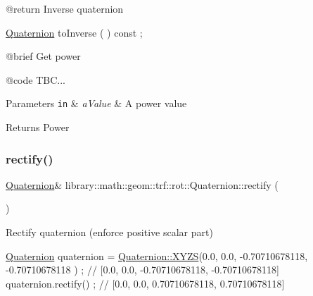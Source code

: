 \begin{DoxyCode}
    @\textcolor{keywordflow}{return}             Inverse quaternion

\hyperlink{classlibrary_1_1math_1_1geom_1_1trf_1_1rot_1_1_quaternion_aa7f459a08f5af38b9f7676a6bf36a21c}{Quaternion}              toInverse                                   ( ) \textcolor{keyword}{const} ;

    @brief              Get power
   
    @code
                        TBC...
\end{DoxyCode}



\begin{DoxyParams}[1]{Parameters}
\mbox{\tt in}  & {\em a\+Value} & A power value \\
\hline
\end{DoxyParams}
\begin{DoxyReturn}{Returns}
Power 
\end{DoxyReturn}
\mbox{\label{classlibrary_1_1math_1_1geom_1_1trf_1_1rot_1_1_quaternion_a1196e96c359237ae17b70c08f075acd2}} 
\subsubsection{\texorpdfstring{rectify()}{rectify()}}
{\footnotesize\ttfamily \hyperlink{classlibrary_1_1math_1_1geom_1_1trf_1_1rot_1_1_quaternion}{Quaternion}\& library\+::math\+::geom\+::trf\+::rot\+::\+Quaternion\+::rectify (\begin{DoxyParamCaption}{ }\end{DoxyParamCaption})}



Rectify quaternion (enforce positive scalar part) 


\begin{DoxyCode}
\hyperlink{classlibrary_1_1math_1_1geom_1_1trf_1_1rot_1_1_quaternion_aa7f459a08f5af38b9f7676a6bf36a21c}{Quaternion} quaternion = \hyperlink{classlibrary_1_1math_1_1geom_1_1trf_1_1rot_1_1_quaternion_ad6426210c54c79fc5296b5375380a7ca}{Quaternion::XYZS}(0.0, 0.0, -0.70710678118, -0.70710678118
      ) ; \textcolor{comment}{// [0.0, 0.0, -0.70710678118, -0.70710678118]}
quaternion.rectify() ; \textcolor{comment}{// [0.0, 0.0, 0.70710678118, 0.70710678118]}
\end{DoxyCode}


